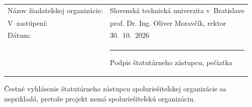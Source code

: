 \documentclass[10pt,a4paper]{article}
\begin{document}
\medskip
\begin{tabularx}{\linewidth}{XX}
Názov žiadateľskej organizácie: & Slovenská technická univerzita v~Bratislave \\
V~zastúpení: & prof. Dr. Ing. Oliver Moravčík, rektor \\
Dátum: & 30.~10.~2026 \\[1.5em]
 & \rule{50mm}{0.4pt}\newline Podpis štatutárneho zástupcu, pečiatka \\
\end{tabularx}

Čestné vyhlásenie štatutárneho zástupcu spoluriešiteľskej organizácie sa
neprikladá, pretože projekt nemá spoluriešiteľskú organizáciu.
\end{document}
